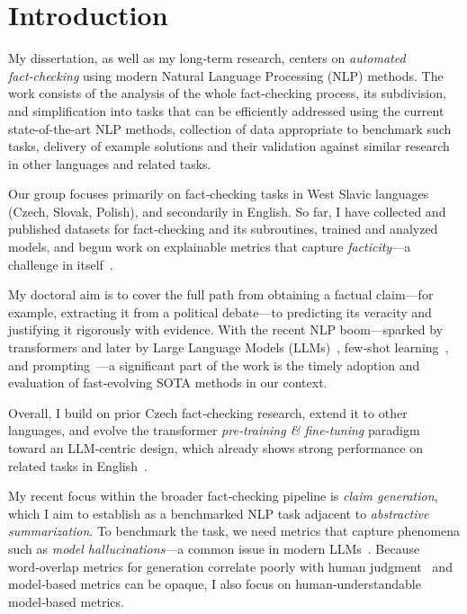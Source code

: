 
\chapter{Introduction}
\label{chap:intro}

My dissertation, as well as my long‑term research, centers on \textit{automated fact‑checking} using modern Natural Language Processing (NLP) methods.
The work consists of the analysis of the whole fact-checking process, its subdivision, and simplification into tasks that can be efficiently addressed using the current state-of-the-art NLP methods, collection of data appropriate to benchmark such tasks, delivery of example solutions and their validation against similar research in other languages and related tasks.

Our group focuses primarily on fact‑checking tasks in West Slavic languages (Czech, Slovak, Polish), and secondarily in English.
So far, I have collected and published datasets for fact‑checking and its subroutines, trained and analyzed models, and begun work on explainable metrics that capture \textit{facticity}—a challenge in itself~\cite{ffci,wright}.

My doctoral aim is to cover the full path from obtaining a factual claim—for example, extracting it from a political debate—to predicting its veracity and justifying it rigorously with evidence.
With the recent NLP boom—sparked by transformers and later by Large Language Models (LLMs)~\cite{llms}, few‑shot learning~\cite{gpt3}, and prompting~\cite{prompting}—a significant part of the work is the timely adoption and evaluation of fast‑evolving SOTA methods in our context.

Overall, I build on prior Czech fact‑checking research, extend it to other languages, and evolve the transformer \textit{pre‑training \& fine‑tuning} paradigm toward an LLM‑centric design, which already shows strong performance on related tasks in English~\cite{bing}.

My recent focus within the broader fact‑checking pipeline is \textit{claim generation}, which I aim to establish as a benchmarked NLP task adjacent to \textit{abstractive summarization}.
To benchmark the task, we need metrics that capture phenomena such as \textit{model hallucinations}—a common issue in modern LLMs~\cite{Ji_2023}.
Because word‑overlap metrics for generation correlate poorly with human judgment~\cite{bert-score} and model‑based metrics can be opaque, I also focus on human‑understandable model‑based metrics.

